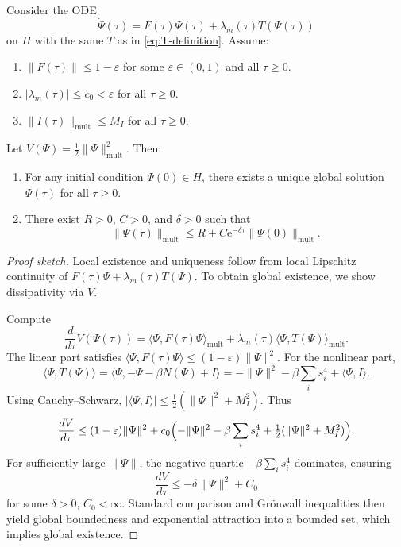 \documentclass[11pt]{article}
\begin{document}
\begin{theorem}
\label{thm:continuous}
Consider the ODE
\[
\dot{\Psi}(\tau)
= F(\tau)\Psi(\tau) + \lambda_m(\tau)T(\Psi(\tau))
\]
on \(H\) with the same \(T\) as in \eqref{eq:T-definition}.
Assume:
\begin{enumerate}[label=(\roman*), leftmargin=*]
  \item \(\|F(\tau)\|\le 1-\varepsilon\) for some \(\varepsilon\in(0,1)\) and all \(\tau\ge 0\).
  \item \(|\lambda_m(\tau)|\le c_0 < \varepsilon\) for all \(\tau\ge 0\).
  \item \(\|I(\tau)\|_{\mathrm{mult}}\le M_I\) for all \(\tau\ge 0\).
\end{enumerate}
Let \(V(\Psi) = \frac12\|\Psi\|_{\mathrm{mult}}^2\).
Then:
\begin{enumerate}[label=(\alph*), leftmargin=*]
  \item For any initial condition \(\Psi(0)\in H\), there exists a unique global solution \(\Psi(\tau)\) for all \(\tau\ge 0\).
  \item There exist \(R>0\), \(C>0\), and \(\delta>0\) such that
  \[
  \|\Psi(\tau)\|_{\mathrm{mult}}
  \le R + C \mathrm{e}^{-\delta \tau}\|\Psi(0)\|_{\mathrm{mult}}.
  \]
\end{enumerate}
\end{theorem}

\begin{proof}[Proof sketch]
Local existence and uniqueness follow from local Lipschitz continuity of \(F(\tau)\Psi + \lambda_m(\tau)T(\Psi)\).
To obtain global existence, we show dissipativity via \(V\).

Compute
\[
\frac{d}{d\tau}V(\Psi(\tau))
= \langle \Psi, F(\tau)\Psi\rangle_{\mathrm{mult}}
+ \lambda_m(\tau)\langle \Psi, T(\Psi)\rangle_{\mathrm{mult}}.
\]
The linear part satisfies \(\langle\Psi,F(\tau)\Psi\rangle\le (1-\varepsilon)\|\Psi\|^2\).
For the nonlinear part,
\[
\langle\Psi,T(\Psi)\rangle
= \langle\Psi, -\Psi -\beta N(\Psi) + I\rangle
= -\|\Psi\|^2 -\beta \sum_i s_i^4 + \langle\Psi,I\rangle.
\]
Using Cauchy–Schwarz, \(|\langle\Psi,I\rangle|\le \frac12(\|\Psi\|^2 + M_I^2)\).
Thus
\[
\frac{dV}{d\tau}
\le (1-\varepsilon)\|\Psi\|^2
+ c_0\Bigl(-\|\Psi\|^2 -\beta\sum_i s_i^4 + \tfrac12(\|\Psi\|^2 + M_I^2)\Bigr).
\]
For sufficiently large \(\|\Psi\|\), the negative quartic \(-\beta\sum_i s_i^4\) dominates, ensuring
\[
\frac{dV}{d\tau} \le -\delta \|\Psi\|^2 + C_0
\]
for some \(\delta>0\), \(C_0<\infty\).
Standard comparison and Grönwall inequalities then yield global boundedness and exponential attraction into a bounded set, which implies global existence.
\end{proof}
\end{document}
